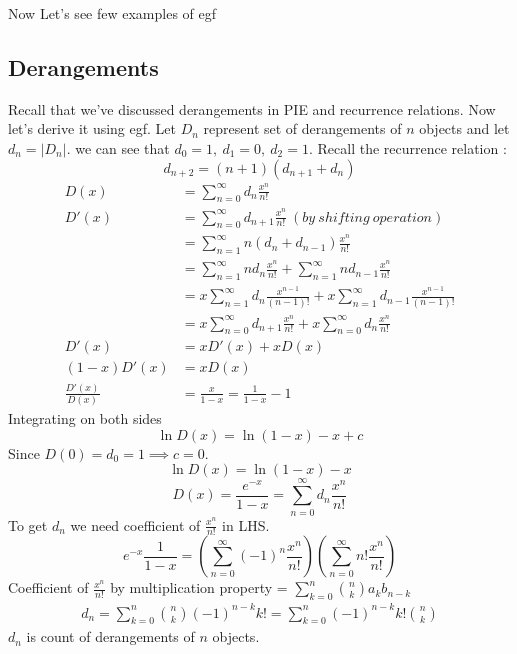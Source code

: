\begin{parts}
 Now Let's see few examples of egf 
 \subsection{Derangements } Recall that we've discussed derangements in PIE and recurrence relations. Now let's derive it using egf. Let $D_n$ represent set of derangements of $n$ objects and let $d_n = |D_n|$. we can see that $d_0 = 1 ,~ d_1 = 0,~ d_2 = 1$. Recall the recurrence relation : $$ d_{n+2} = (n+1)(d_{n+1} + d_n)$$
 \begin{align*}
     D(x) &= \sum_{n=0}^{\infty} d_n \frac{x^n}{n!} \\
     D'(x) &= \sum_{n=0}^{\infty} d_{n+1} \frac{x^n}{n!} ~(by ~shifting ~operation)\\
     &= \sum_{n=1}^{\infty} n(d_n + d_{n-1}) \frac{x^n}{n!} \\
     &= \sum_{n=1}^{\infty} nd_n \frac{x^n}{n!} + \sum_{n=1}^{\infty} nd_{n-1} \frac{x^n}{n!} \\
     &= x \sum_{n=1}^{\infty} d_n \frac{x^{n-1}}{(n-1)!} + x \sum_{n=1}^{\infty} d_{n-1} \frac{x^{n-1}}{(n-1)!} \\
     &= x \sum_{n=0}^{\infty} d_{n+1} \frac{x^n}{n!} + x \sum_{n=0}^{\infty} d_n \frac{x^n}{n!} \\
     D'(x) &= xD'(x) + xD(x) \\
     (1-x)D'(x) &= xD(x) \\
     \frac{D'(x)}{D(x)} &= \frac{x}{1-x} = \frac{1}{1-x} - 1
 \end{align*}
Integrating on both sides
     $$\ln{D(x)} = \ln{(1-x)} - x + c$$
Since $D(0) = d_0 = 1 \implies c=0$.
    $$\ln{D(x)} = \ln{(1-x)} - x$$
    $$D(x) = \frac{e^{-x}}{1-x} = \sum_{n=0}^{\infty} d_n \frac{x^n}{n!}$$
To get $d_n$ we need coefficient of $\frac{x^n}{n!}$ in LHS.
$$e^{-x} \frac{1}{1-x} = (\sum_{n=0}^{\infty} (-1)^n \frac{x^n}{n!})(\sum_{n=0}^{\infty} n! \frac{x^n}{n!})$$
Coefficient of $\frac{x^n}{n!}$ by multiplication property = $\sum_{k=0}^{n} {n \choose k} a_k b_{n-k}$
\begin{align*}
    d_n = \sum_{k=0}^{n} {n \choose k} (-1)^{n-k} k!  
    = \sum_{k=0}^{n} (-1)^{n-k} k! {n \choose k}
\end{align*}
$d_n$ is count of derangements of $n$ objects.


\end{parts}
